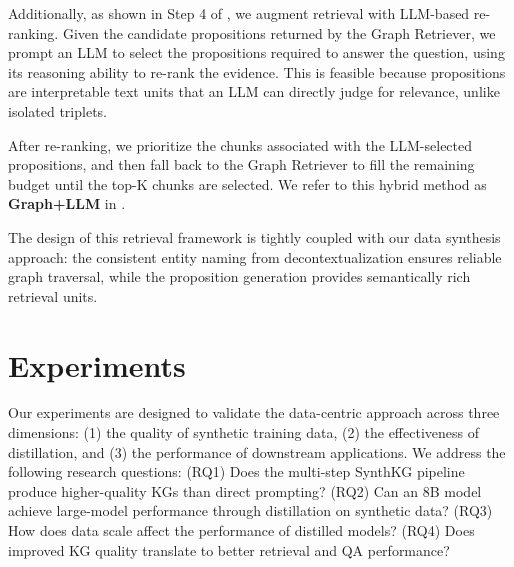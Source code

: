 \documentclass{article} %
\begin{document}
Additionally, as shown in Step 4 of , we augment retrieval with LLM-based re-ranking. Given the candidate propositions returned by the Graph Retriever, we prompt an LLM to select the propositions required to answer the question, using its reasoning ability to re-rank the evidence. This is feasible because propositions are interpretable text units that an LLM can directly judge for relevance, unlike isolated triplets.

After re-ranking, we prioritize the chunks associated with the LLM-selected propositions, and then fall back to the Graph Retriever to fill the remaining budget until the top-K chunks are selected. We refer to this hybrid method as \textbf{Graph+LLM} in .



The design of this retrieval framework is tightly coupled with our data synthesis approach: the consistent entity naming from decontextualization ensures reliable graph traversal, while the proposition generation provides semantically rich retrieval units.

\section{Experiments} \label{sec:experiments}

Our experiments are designed to validate the data-centric approach across three dimensions: (1) the quality of synthetic training data, (2) the effectiveness of distillation, and (3) the performance of downstream applications. We address the following research questions: (RQ1) Does the multi-step SynthKG pipeline produce higher-quality KGs than direct prompting? (RQ2) Can an 8B model achieve large-model performance through distillation on synthetic data? (RQ3) How does data scale affect the performance of distilled models? (RQ4) Does improved KG quality translate to better retrieval and QA performance?
\end{document}
